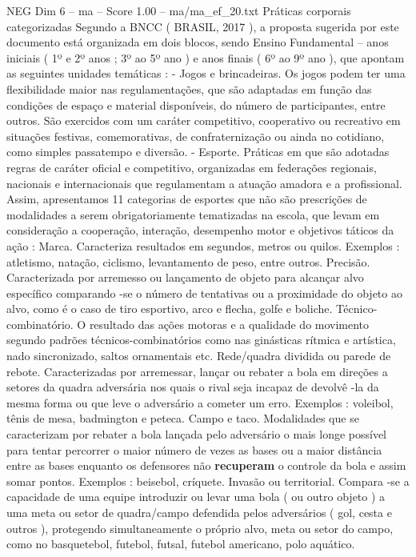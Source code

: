 \begin{textsample}{NEG Dim 6 – ma – Score 1.00 – ma/ma\_ef\_20.txt}  \label{ex:f6_neg_197}
Práticas corporais categorizadas Segundo a BNCC ( BRASIL, 2017 ), a proposta sugerida por este documento está organizada em dois blocos, sendo Ensino Fundamental – anos iniciais ( 1º e 2º anos ; 3º ao 5º ano ) e anos finais ( 6º ao 9º ano ), que apontam as seguintes unidades temáticas : - Jogos e brincadeiras.
Os jogos podem ter uma flexibilidade maior nas regulamentações, que são adaptadas em função das condições de espaço e material disponíveis, do número de participantes, entre outros.
São exercidos com um caráter competitivo, cooperativo ou recreativo em situações festivas, comemorativas, de confraternização ou ainda no cotidiano, como simples passatempo e diversão. - Esporte.
Práticas em que são adotadas regras de caráter oficial e competitivo, organizadas em federações regionais, nacionais e internacionais que regulamentam a atuação amadora e a profissional.
Assim, apresentamos 11 categorias de esportes que não são prescrições de modalidades a serem obrigatoriamente tematizadas na escola, que levam em consideração a cooperação, interação, desempenho motor e objetivos táticos da ação : Marca.
Caracteriza resultados em segundos, metros ou quilos.
Exemplos : atletismo, natação, ciclismo, levantamento de peso, entre outros.
Precisão.
Caracterizada por arremesso ou lançamento de objeto para alcançar alvo específico comparando -se o número de tentativas ou a proximidade do objeto ao alvo, como é o caso de tiro esportivo, arco e flecha, golfe e boliche.
Técnico-combinatório.
O resultado das ações motoras e a qualidade do movimento segundo padrões técnicos-combinatórios como nas ginásticas rítmica e artística, nado sincronizado, saltos ornamentais etc.
Rede/quadra dividida ou parede de rebote.
Caracterizadas por arremessar, lançar ou rebater a bola em direções a setores da quadra adversária nos quais o rival seja incapaz de devolvê -la da mesma forma ou que leve o adversário a cometer um erro.
Exemplos : voleibol, tênis de mesa, badmington e peteca.
Campo e taco.
Modalidades que se caracterizam por rebater a bola lançada pelo adversário o mais longe possível para tentar percorrer o maior número de vezes as bases ou a maior distância entre as bases enquanto os defensores não \textbf{recuperam} o controle da bola e assim somar pontos.
Exemplos : beisebol, críquete.
Invasão ou territorial.
Compara -se a capacidade de uma equipe introduzir ou levar uma bola ( ou outro objeto ) a uma meta ou setor de quadra/campo defendida pelos adversários ( gol, cesta e outros ), protegendo simultaneamente o próprio alvo, meta ou setor do campo, como no basquetebol, futebol, futsal, futebol americano, polo aquático.

\end{textsample}
